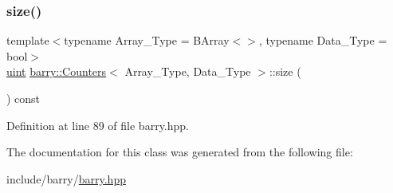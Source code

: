 \mbox{\label{classbarry_1_1_counters_aa70f3d91d0f69ff8f4887930efaa0411}} 
\subsubsection{\texorpdfstring{size()}{size()}}
{\footnotesize\ttfamily template$<$typename Array\+\_\+\+Type = B\+Array$<$$>$, typename Data\+\_\+\+Type = bool$>$ \\
\hyperlink{namespacebarry_a11dfc53ddb4672278319aa04f1e09a6c}{uint} \hyperlink{classbarry_1_1_counters}{barry\+::\+Counters}$<$ Array\+\_\+\+Type, Data\+\_\+\+Type $>$\+::size (\begin{DoxyParamCaption}{ }\end{DoxyParamCaption}) const\hspace{0.3cm}{\ttfamily [inline]}}



Definition at line 89 of file barry.\+hpp.



The documentation for this class was generated from the following file\+:\begin{DoxyCompactItemize}
\item 
include/barry/\hyperlink{barry_8hpp}{barry.\+hpp}\end{DoxyCompactItemize}
